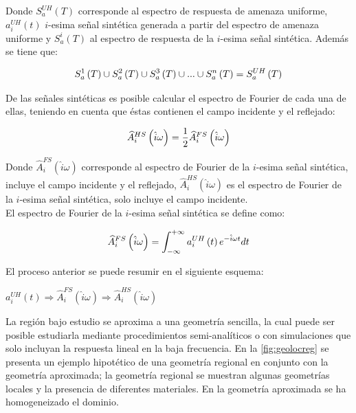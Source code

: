 \documentclass[spanish,letterpaper,12pt,twoside,openany]{article}
\begin{document}
Donde $S_{a}^{UH} \left( T \right)$ corresponde al espectro de respuesta de amenaza uniforme, $a_{i}^{UH}\left( t \right)$ $i$-esima señal sintética generada a partir del espectro de amenaza uniforme y $S_{a}^{i} \left( T \right)$ al espectro de respuesta de la $i$-esima señal sintética. Además se tiene que:
%
\begin{large}
	\begin{align}
		S_{a}^{1} \left( T \right) \cup S_{a}^{2} \left( T \right) \cup S_{a}^{3} \left( T \right) \cup ... \cup S_{a}^{n} \left( T \right) = S_{a}^{UH} \left( T \right)
		\vspace{-1 cm}
	\end{align}	
\end{large}
%
%
De las señales sintéticas es posible calcular el espectro de Fourier de cada una de ellas, teniendo en cuenta que éstas contienen el campo incidente y el reflejado:
%
\begin{large}
	\begin{align}\label{eq:espfouhs}
		\widehat{A}^{HS}_{i} \left( \hat{i} \omega \right) = \dfrac{1}{2} \widehat{A}^{FS}_{i} \left( \hat{i} \omega \right)
	\vspace{-1 cm}
	\end{align}
\end{large}
%
Donde $\widehat{A}^{FS}_{i} \left( \hat{i} \omega \right)$ corresponde al espectro de Fourier de la $i$-esima señal sintética, incluye el campo incidente y el reflejado, $\widehat{A}^{HS}_{i} \left( \hat{i} \omega \right)$ es el espectro de Fourier de la $i$-esima señal sintética, solo incluye el campo incidente.\\
%
El espectro de Fourier de la $i$-esima señal sintética se define como:
%
\begin{large}
	\begin{align}\label{eq:fourdirec}
		\widehat{A}^{FS}_{i} \left( \hat{i} \omega \right) = \int_{-\infty}^{+\infty} a_{i}^{UH} \left( t \right) e^{-\hat{i} \omega t} dt 
	\vspace{-1 cm}
	\end{align}
\end{large}
%
El proceso anterior se puede resumir en el siguiente esquema:

\begin{large}
	$a_{i}^{UH}\left( t \right) \Rightarrow \widehat{A}^{FS}_{i} \left( \hat{i} \omega \right) \Rightarrow \widehat{A}^{HS}_{i} \left( \hat{i} \omega \right)$
\end{large} 

La región bajo estudio se aproxima a una geometría sencilla, la cual puede ser posible estudiarla mediante procedimientos semi-analíticos o con simulaciones que solo incluyan la respuesta lineal en la baja frecuencia. En la \cref{fig:geolocreg} se presenta un ejemplo hipotético de una geometría regional en conjunto con la geometría aproximada; la geometría regional se muestran algunas geometrías locales y la presencia de diferentes materiales. En la geometría aproximada se ha homogeneizado el dominio.
\end{document}
